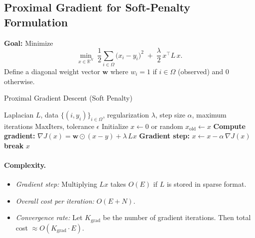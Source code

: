 \documentclass[12pt]{article}                                %
\begin{document}
\subsection{Proximal Gradient for Soft-Penalty Formulation}

\noindent
\textbf{Goal:} Minimize
\[
\underset{x\in \mathbb{R}^N}{\min}\; \frac{1}{2}\sum_{i\in \Omega}\bigl(x_i - y_i\bigr)^2 \;+\; \frac{\lambda}{2}\, x^\top L\, x.
\]
Define a diagonal weight vector $\mathbf{w}$ where $w_i=1$ if $i\in\Omega$ (observed) and $0$ otherwise.

\begin{algorithm}[H]
\caption{Proximal Gradient Descent (Soft Penalty)}
\label{alg:grad}
\begin{algorithmic}[1]
\Require Laplacian $L$, data $\{(i,y_i)\}_{i\in\Omega}$, regularization $\lambda$, step size $\alpha$, maximum iterations $\text{MaxIters}$, tolerance $\epsilon$
\State Initialize $x \gets 0$ or random
   \State $x_{\text{old}} \gets x$
   \State \textbf{Compute gradient:} $\nabla J(x) = \mathbf{w}\odot(x - y) + \lambda \, Lx$
   \State \textbf{Gradient step:} $x \gets x - \alpha\,\nabla J(x)$
      \State \textbf{break}
   \EndIf
\EndFor
\State \Return $x$
\end{algorithmic}
\end{algorithm}

\paragraph{Complexity.}
\begin{itemize}
    \item \emph{Gradient step:} Multiplying $Lx$ takes $O(E)$ if $L$ is stored in sparse format.  
    \item \emph{Overall cost per iteration:} $O(E + N)$.  
    \item \emph{Convergence rate:} Let $K_{\mathrm{grad}}$ be the number of gradient iterations. Then total cost $\approx O(K_{\mathrm{grad}}\cdot E)$. 
\end{itemize}

\end{document}
